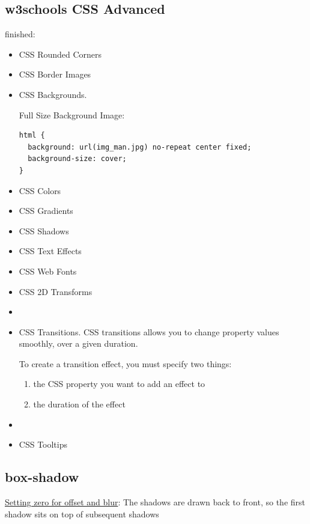 \documentclass[a4paper, 12pt]{article}
\begin{document}
\subsection{w3schools CSS Advanced}
\noindent finished:
\begin{itemize}
\item CSS Rounded Corners

\item CSS Border Images

\item CSS Backgrounds. 

Full Size Background Image:
\begin{verbatim}
html {
  background: url(img_man.jpg) no-repeat center fixed;
  background-size: cover;
}
\end{verbatim}

\item CSS Colors

\item CSS Gradients

\item CSS Shadows

\item CSS Text Effects

\item CSS Web Fonts

\item CSS 2D Transforms

\item 

\item CSS Transitions. CSS transitions allows you to change property values smoothly, over a given duration.

To create a transition effect, you must specify two things:
\begin{enumerate}
\item the CSS property you want to add an effect to

\item the duration of the effect

\end{enumerate}

\item 

\item CSS Tooltips

\end{itemize}

\subsection{box-shadow}
\href{https://developer.mozilla.org/en-US/docs/Web/CSS/box-shadow/#Setting_zero_for_offset_and_blur}{Setting zero for offset and blur}: The shadows are drawn back to front, so the first shadow sits on top of subsequent shadows
\end{document}
